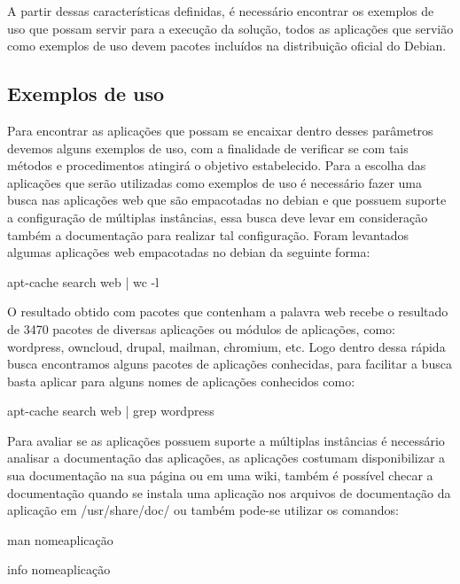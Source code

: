 A partir dessas características definidas, é necessário encontrar os exemplos de uso
que possam servir para a execução da solução, todos as aplicações que servião como
exemplos de uso devem pacotes incluídos na distribuição oficial do Debian.

\subsection{Exemplos de uso}
\label{subsection:exemplos}

Para encontrar as aplicações que possam se encaixar dentro desses parâmetros devemos
alguns exemplos de uso, com a finalidade de verificar se com tais métodos e
procedimentos atingirá o objetivo estabelecido. Para a escolha das aplicações que
serão utilizadas como exemplos de uso é necessário fazer uma busca nas aplicações
web que são empacotadas no debian e que possuem suporte a configuração de múltiplas
instâncias, essa busca deve levar em consideração também a documentação para realizar
tal configuração. Foram levantados algumas aplicações web empacotadas no debian da
seguinte forma:

\begin{center}
apt-cache search web | wc -l
\end{center}

O resultado obtido com pacotes que contenham a palavra web recebe o resultado de 3470
pacotes de diversas aplicações ou módulos de aplicações, como:
wordpress, owncloud, drupal, mailman, chromium, etc. Logo dentro dessa rápida busca
encontramos alguns pacotes de aplicações conhecidas, para facilitar a busca basta
aplicar para alguns nomes de aplicações conhecidos como:

\begin{center}
apt-cache search web | grep wordpress
\end{center}

Para avaliar se as aplicações possuem suporte a múltiplas instâncias é necessário
analisar a documentação das aplicações, as aplicações costumam disponibilizar a sua
documentação na sua página ou em uma wiki, também é possível checar a documentação
quando se instala uma aplicação nos arquivos de documentação da aplicação em
/usr/share/doc/ ou também pode-se utilizar os comandos:

\begin{center}
man nomeaplicação

info nomeaplicação
\end{center}

